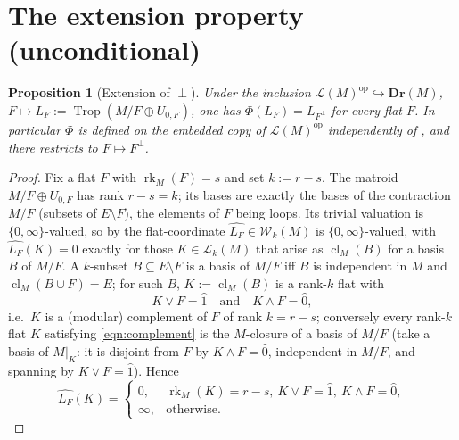 \documentclass{article}
\newtheorem{proposition}[theorem]{Proposition}
\theoremstyle{definition}
\newcommand{\rk}{\operatorname{rk}}
\newcommand{\cl}{\operatorname{cl}}
\newcommand{\Trop}{\operatorname{Trop}}
\newcommand{\op}{\operatorname{op}}
\newcommand{\into}{\hookrightarrow}
\newcommand{\Dr}{\mathbf{Dr}}
\newcommand{\cLL}{\mathcal{L}}
\newcommand{\cW}{\mathcal{W}}
\begin{document}
\section{The extension property (unconditional)}

\begin{proposition}[Extension of $\perp$]\label{prop:ext}
Under the inclusion $\cLL(M)^{\op}\into\Dr(M)$, $F\mapsto L_F:=\Trop(M/F\oplus U_{0,F})$, one has
$\Phi(L_F)=L_{F^{\perp}}$ for every flat $F$. In particular $\Phi$ is defined on the embedded copy of
$\cLL(M)^{\op}$ \emph{independently of }, and there restricts to
$F\mapsto F^{\perp}$.
\end{proposition}

\begin{proof}
Fix a flat $F$ with $\rk_M(F)=s$ and set $k:=r-s$. The matroid $M/F\oplus U_{0,F}$ has rank $r-s=k$;
its bases are exactly the bases of the contraction $M/F$ (subsets of $E\setminus F$), the elements of
$F$ being loops. Its trivial valuation is $\{0,\infty\}$-valued, so by  the
flat-coordinate $\widehat{L_F}\in\cW_{k}(M)$ is $\{0,\infty\}$-valued, with $\widehat{L_F}(K)=0$
exactly for those $K\in\cLL_{k}(M)$ that arise as $\cl_M(B)$ for a basis $B$ of $M/F$. A $k$-subset
$B\subseteq E\setminus F$ is a basis of $M/F$ iff $B$ is independent in $M$ and $\cl_M(B\cup F)=E$;
for such $B$, $K:=\cl_M(B)$ is a rank-$k$ flat with
\begin{equation}\label{eqn:complement}
  K\vee F=\hat1\quad\text{and}\quad K\wedge F=\hat0 ,
\end{equation}
i.e.\ $K$ is a (modular) complement of $F$ of rank $k=r-s$; conversely every rank-$k$ flat $K$
satisfying \eqref{eqn:complement} is the $M$-closure of a basis of $M/F$ (take a basis of $M|_K$: it
is disjoint from $F$ by $K\wedge F=\hat0$, independent in $M/F$, and spanning by $K\vee F=\hat1$).
Hence
\begin{equation}\label{eqn:LF-coord}
  \widehat{L_F}(K)=\begin{cases}0,& \rk_M(K)=r-s,\ K\vee F=\hat1,\ K\wedge F=\hat0,\\
  \infty,&\text{otherwise.}\end{cases}
\end{equation}


\end{proof}
\end{document}
